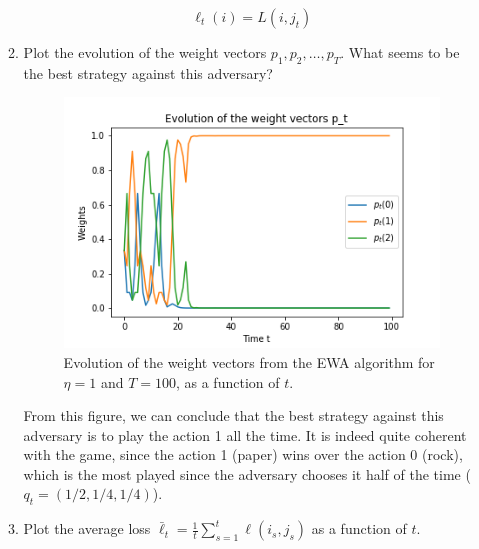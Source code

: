 \begin{enumerate}[resume]
\begin{enumerate}[label=(\alph*)]
\begin{solution}
    \begin{equation*}
        \boxed{\ell_t(i)=L(i,j_t)}
    \end{equation*}
        \end{solution}
		
		
 		\item Plot the evolution of the weight vectors $p_1,p_2,\dots,p_T$. What seems to be the best strategy against this adversary?
 		
	    \begin{solution}
\begin{figure}[h!]
\begin{center}
\includegraphics[height=170 pt]{image1/q3b_weights.png} 
\end{center}
\caption{Evolution of the weight vectors from the EWA algorithm for $\eta = 1$ and $T = 100$, as a function of $t$.}
\end{figure}
From this figure, we can conclude that the best strategy against this adversary is to play the action 1 all the time. It is indeed quite coherent with the game, since the action 1 (paper) wins over the action 0 (rock), which is the most played since the adversary chooses it half of the time ($q_t = (1/2,1/4,1/4)$).
        \end{solution}
 		
 		
 		\item Plot the average loss $\bar \ell_t = \frac{1}{t} \sum_{s=1}^t \ell(i_s,j_s)$ as a function of $t$.
 		

\end{enumerate}
\end{enumerate}
